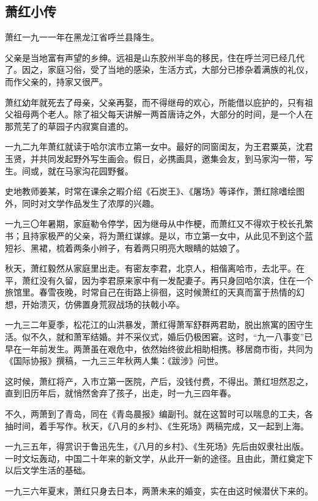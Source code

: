 \subsection{萧红小传}


\par 萧红一九一一年在黑龙江省呼兰县降生。
\par 父亲是当地富有声望的乡绅。远祖是山东胶州半岛的移民，住在呼兰河已经几代了。因之，家庭习俗，受了当地的感染，生活方式，大部分已掺杂着满族的礼仪，而作父亲的，持家又很严。
\par 萧红幼年就死去了母亲，父亲再娶，而不得继母的欢心，所能借以庇护的，只有祖父祖母两个老人。除了祖父每天讲解一两首唐诗之外，大部分的时间，是一个人在那荒芜了的草园子内寂寞自遣的。
\par 一九二九年萧红就读于哈尔滨市立第一女中。最好的同窗闺友，为王君粟英，沈君玉贤，并共同发起野外写生画会。假日，必携画具，邀集会友，到马家沟一带，写生。间或，就在马家沟花园野餐。
\par 史地教师姜某，时常在课余之暇介绍《石炭王》、《屠场》等译作，萧红除嗜绘图外，同时对文学作品发生了浓厚的兴趣。
\par 一九三〇年暑期，家庭勒令停学，因为继母从中作梗，而萧红又不得欢于校长孔繁书；且持家极严的父亲，将为萧红谋嫁。是以，市立第一女中，从此见不到这个蓝短衫、黑裙，梳着两条小辫子，有着两只明亮大眼睛的姑娘了。
\par 秋天，萧红毅然从家庭里出走。有密友李君，北京人，相偕离哈市，去北平。在平，萧红没有久留，因为李君原来家中有一发配妻子。再只身回哈尔滨，住在一个旅馆里。春雪夜晚，时常自己在街路上徘徊，这时候萧红的天真而富于热情的幻想，开始溃灭，仿佛置身荒寂战场的扶戟小卒。
\par 一九三二年夏季，松花江的山洪暴发，萧红得萧军舒群两君助，脱出旅寓的困守生活。似不久，就和萧军结婚。并不采仪式，婚后仍极困窘。这时，“九一八事变”已早在一年前发生。两萧虽在艰危中，依然始终彼此相助相携。移居商市街，共同为《国际协报》撰稿，一九三三年秋两人集：《跋涉》问世。
\par 这时候，萧红将产，入市立第一医院，产后，没钱付费，不得出。萧红坦然忍之，直到旧历年后，就悄然舍弃了孩子，出走，时一九三四年春。
\par 不久，两萧到了青岛，同在《青岛晨报》编副刊。就在这暂时可以喘息的工夫，各抽时间，着手写作。秋天，《八月的乡村》、《生死场》两稿完成，又一起到上海。
\par 一九三五年，得赏识于鲁迅先生，《八月的乡村》、《生死场》先后由奴隶社出版。一时文坛轰动，中国二十年来的新文学，从此开一新的途径。且由此，萧红奠定下以后文学生活的基础。
\par 一九三六年夏末，萧红只身去日本，两萧未来的婚变，实在由这时候潜伏下来的。
